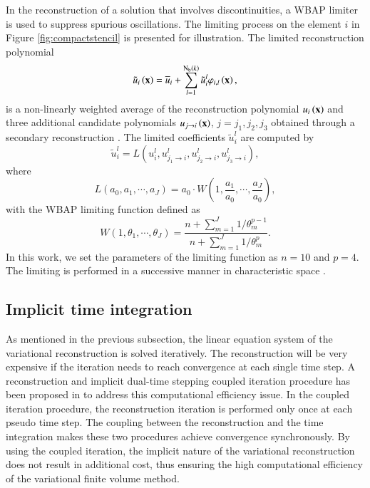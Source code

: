 In the reconstruction of a solution that involves discontinuities, a WBAP limiter \cite{li2011multi,li2012multi} is used to suppress spurious oscillations. The limiting process on the element $i$ in Figure \ref{fig:compactstencil} is presented for illustration. The limited reconstruction polynomial
\begin{equation}\label{eqn:Limited_Polynomial}
    \tilde{u}_{i} \left(\mathbf{x}\right) = \overline{u}_{i} + \sum_{l=1}^{\mathrm{N_b}\left(k\right)} \tilde{u}_i^l \varphi_{i,l}  \left(\mathbf{x}\right),
\end{equation}
is a non-linearly weighted average of the reconstruction polynomial $u_i \left(\mathbf{x}\right)$ and three additional candidate polynomials $u_{j \rightarrow i} \left(\mathbf{x}\right)$, $j=j_1, j_2, j_3$ obtained through a secondary reconstruction \cite{li2012high}. The limited coefficients $\tilde{u}^l_i$ are computed by
\begin{equation}\label{eq:Limiting}
    \tilde{u}_i^l= L\left(u_i^l, u^l_{j_1 \rightarrow i}, u^l_{j_2 \rightarrow i}, u^l_{j_3 \rightarrow i}\right),
\end{equation}
where
\begin{equation}
    L(a_0,a_1,\cdots, a_J)=a_0\cdot{W\left(1,\frac{a_1}{a_0}, \cdots, \frac{a_J}{a_0}\right)},
\end{equation}
with the WBAP limiting function defined as
\begin{equation}
W(1,\theta_1,\cdots, \theta_J)=\frac{n+\sum_{m=1}^{J}{1/\theta_m^{p-1}}}{n+\sum_{m=1}^{J}{1/\theta_m^{p}}}.
\end{equation}
In this work, we set the parameters of the limiting function as $n=10$ and $p=4$. The limiting is performed in a successive manner in characteristic space \cite{li2012multi}.

\subsection{Implicit time integration}
\label{ssec:TimeMarching}

As mentioned in the previous subsection, the linear equation system of the variational reconstruction is solved iteratively. The reconstruction will be very expensive if the iteration needs to reach convergence at each single time step. A reconstruction and implicit dual-time stepping coupled iteration procedure has been proposed in \cite{wang2016compact1_VR} to address this computational efficiency issue. In the coupled iteration procedure, the reconstruction iteration is performed only once at each pseudo time step. The coupling between the reconstruction and the time integration makes these two procedures achieve convergence synchronously. By using the coupled iteration, the implicit nature of the variational reconstruction does not result in additional cost, thus ensuring the high computational efficiency of the variational finite volume method.

